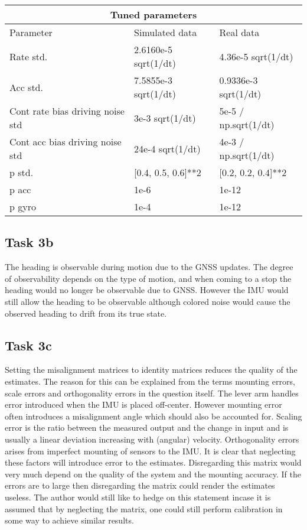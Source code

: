 \begin{tabular}{ |p{5.5cm}||p{4cm}|p{4cm}|  }
	\hline
	\multicolumn{3}{|c|}{Tuned parameters} \\
	\hline
	Parameter & Simulated data & Real data\\
	\hline
	Rate std.			& 2.6160e-5 sqrt(1/dt)	&   4.36e-5 sqrt(1/dt)\\
	Acc std.			& 7.5855e-3	sqrt(1/dt)  &	0.9336e-3 sqrt(1/dt)\\
	Cont rate bias driving noise std	& 3e-3 sqrt(1/dt)	& 5e-5 / np.sqrt(1/dt)\\	
	Cont acc bias driving noise std		& 24e-4 sqrt(1/dt)	& 4e-3 / np.sqrt(1/dt)\\
	p std.							& [0.4, 0.5, 0.6]**2 	& [0.2, 0.2, 0.4]**2\\
	p acc							& 1e-6 		& 1e-12\\
	p gyro 							& 1e-4 		& 1e-12\\
	\hline
\end{tabular}



\subsection*{Task 3b}

The heading is observable during motion due to the GNSS updates. The degree of observability depends
on the type of motion, and when coming to a stop the heading would no longer be observable due to GNSS.
However the IMU would still allow the heading to be observable although colored noise would cause the 
observed heading to drift from its true state.

\subsection*{Task 3c}

Setting the misalignment matrices to identity matrices reduces the quality of the estimates.
The reason for this can be explained from the terms mounting errors, scale errors and 
orthogonality errors in the question itself. The lever arm handles error introduced 
when the IMU is placed off-center. However mounting error often introduces a misalignment angle 
which should also be accounted for. Scaling error is the ratio between the measured 
output and the change in input and is usually a linear deviation increasing with (angular) velocity.
Orthogonality errors arises from imperfect mounting of sensors to the IMU. It is clear that neglecting
these factors will introduce error to the estimates. Disregarding this matrix would very much 
depend on the quality of the system and the mounting accuracy. If the errors are to large then 
disregarding the matrix could render the estimates useless. The author would still like to hedge 
on this statement incase it is assumed that by neglecting the matrix, one could still perform 
calibration in some way to achieve similar results.

